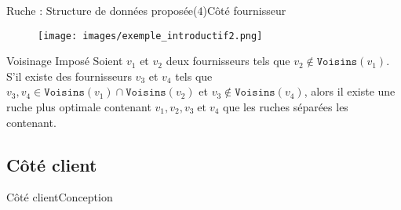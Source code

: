 \documentclass[usenames,dvipsnames]{beamer}
\begin{document}
\begin{frame}{Ruche : Structure de données proposée($4$)}{Côté fournisseur}
\begin{figure}[!ht]
  \centering
  \texttt{[image: images/exemple\_introductif2.png]}
\end{figure}

\begin{block}{Voisinage Imposé}
Soient $v_1$ et $v_2$ deux fournisseurs tels que $v_2 \notin \texttt{Voisins}(v_1)$. S'il existe des fournisseurs $v_3$ et $v_4$ tels que $v_3, v_4 \in \texttt{Voisins}(v_1) \cap \texttt{Voisins}(v_2)$ et $v_3 \notin \texttt{Voisins}(v_4)$, alors il existe une ruche plus optimale contenant $v_1, v_2, v_3\; \text{et}\; v_4$ que les ruches séparées les contenant.
\end{block}
\end{frame}

\subsection{Côté client}


% 
% 
\begin{frame}{Côté client}{Conception}
  \begin{figure}[!ht]
  \end{figure}
\end{frame}
\end{document}
